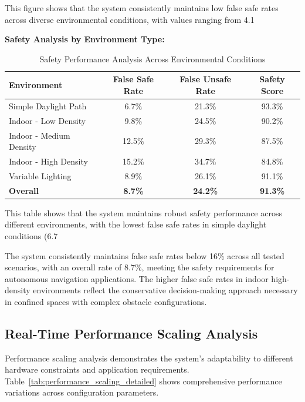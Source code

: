 \documentclass[12pt,oneside]{book}
\newcommand{\tabref}[1]{Table~\ref{#1}}
\begin{document}
This figure shows that the system consistently maintains low false safe rates across diverse environmental conditions, with values ranging from 4.1%

\textbf{Safety Analysis by Environment Type:}

\begin{table}[ht]
\centering
\caption{Safety Performance Analysis Across Environmental Conditions}
\label{tab:safety_analysis}
\begin{tabular}{@{}lccc@{}}
\toprule
\textbf{Environment} & \textbf{False Safe Rate} & \textbf{False Unsafe Rate} & \textbf{Safety Score} \\
\midrule
Simple Daylight Path & 6.7\% & 21.3\% & 93.3\% \\
Indoor - Low Density & 9.8\% & 24.5\% & 90.2\% \\
Indoor - Medium Density & 12.5\% & 29.3\% & 87.5\% \\
Indoor - High Density & 15.2\% & 34.7\% & 84.8\% \\
Variable Lighting & 8.9\% & 26.1\% & 91.1\% \\
\midrule
\textbf{Overall} & \textbf{8.7\%} & \textbf{24.2\%} & \textbf{91.3\%} \\
\bottomrule
\end{tabular}
\end{table}

This table shows that the system maintains robust safety performance across different environments, with the lowest false safe rates in simple daylight conditions (6.7%

The system consistently maintains false safe rates below 16\% across all tested scenarios, with an overall rate of 8.7\%, meeting the safety requirements for autonomous navigation applications. The higher false safe rates in indoor high-density environments reflect the conservative decision-making approach necessary in confined spaces with complex obstacle configurations.

\subsection{Real-Time Performance Scaling Analysis}

Performance scaling analysis demonstrates the system's adaptability to different hardware constraints and application requirements. \tabref{tab:performance_scaling_detailed} shows comprehensive performance variations across configuration parameters.
\end{document}
